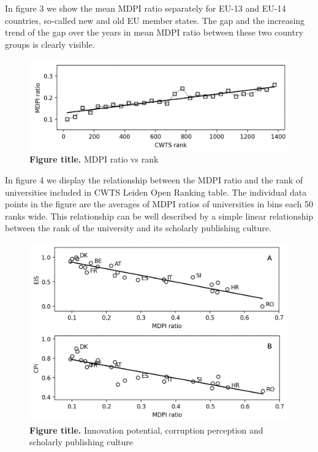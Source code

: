 \documentclass[amsfonts, amssymb, prl, superscriptaddress, notitlepage, twocolumn, nofootinbib]{revtex4-2}
\begin{document}
In figure 3 we show the mean MDPI ratio separately for EU-13 and EU-14 countries, so-called new and old EU member states. The
gap and the increasing trend of the gap over the years in mean MDPI ratio between these two country groups is clearly visible. 

\begin{figure}
    \centering
    \includegraphics[width=1.0\linewidth]{Fig03.png}
    \caption{\label{fig:fig3} {\bf Figure title.} MDPI ratio vs rank  
}
\end{figure}

In figure 4 we display the relationship between the MDPI ratio and the rank of universities included in CWTS Leiden Open Ranking table. The individual data points in the figure are the averages of MDPI ratios of universities in bins each 50 ranks wide. This relationship can be well described by a simple linear relationship between the rank of the university and its scholarly publishing culture.  

\begin{figure}
    \centering
    \includegraphics[width=1.0\linewidth]{Fig04.png}
    \caption{\label{fig:fig4} {\bf Figure title.} Innovation potential, corruption perception and scholarly publishing culture  
}
\end{figure}
\end{document}
